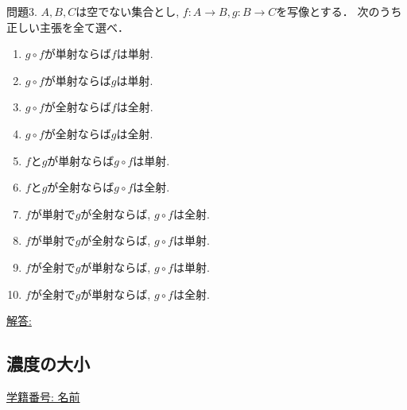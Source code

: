 \documentclass[dvipdfmx,a4paper,11pt]{article}
\theoremstyle{definition}
\begin{document}
問題3.  $A,B,C$は空でない集合とし, $f : A \to B, g : B \to C$を写像とする． 次のうち正しい主張を全て選べ．
\begin{enumerate}[label=(\arabic*).]
 \setlength{\parskip}{0cm}
  \setlength{\itemsep}{0pt}
\item $g \circ f$が単射ならば$f$は単射.
\item $g \circ f$が単射ならば$g$は単射.
\item $g \circ f$が全射ならば$f$は全射.
\item $g \circ f$が全射ならば$g$は全射.
 \item $f$と$g$が単射ならば$g \circ f$は単射.
  \item $f$と$g$が全射ならば$g \circ f$は全射.
 \item $f$が単射で$g$が全射ならば, $g \circ f$は全射. 
 \item $f$が単射で$g$が全射ならば, $g \circ f$は単射.
  \item $f$が全射で$g$が単射ならば, $g \circ f$は単射. 
   \item $f$が全射で$g$が単射ならば, $g \circ f$は全射. 
\end{enumerate}
    
\vspace{30pt}
  { \large \underline{解答: \hspace{13cm}}}
  

\newpage
  
 \begin{center}
\section{濃度の大小}
\label{sec-5}
\end{center}

 \begin{flushleft}
{ \large \underline{学籍番号: \hspace{4cm} 名前  \hspace{8.5cm}}}
{\footnotesize }
\end{flushleft}
\end{document}
